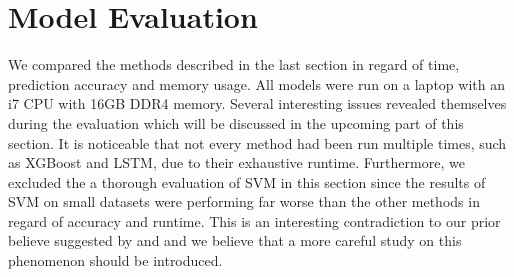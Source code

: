 \documentclass[letterpaper]{article} %
\begin{document}
\begin{table}[htb]
\caption{Example of TF/IDF Feature Matrix} %
\end{table}

\begin{table}[htb]
\caption{Example of Bag-of-word Feature Matrix} %
\end{table}

\section{Model Evaluation}
We compared the methods described in the last section in regard of time, prediction accuracy and memory usage. All models were run on a laptop with an i7 CPU with 16GB DDR4 memory. Several interesting issues revealed themselves during the evaluation which will be discussed in the upcoming part of this section. It is noticeable that not every method had been run multiple times, such as XGBoost and LSTM, due to their exhaustive runtime. Furthermore, we excluded the a thorough evaluation of SVM in this section since the results of SVM on small datasets were performing far worse than the other methods in regard of accuracy and runtime. This is an interesting contradiction to our prior believe suggested by \cite{rennie2001improving} and \cite{pang2002thumbs} and we believe that a more careful study on this phenomenon should be introduced.
\end{document}
